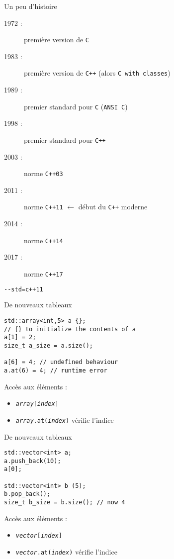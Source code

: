 
\begin{frame}[fragile]{Un peu d'histoire}
  \begin{description}
  \item[1972 :] première version de \texttt{C}
  \item[1983 :] première version de \texttt{C++} (alors \texttt{C with classes})
  \item[1989 :] premier standard pour \texttt{C} (\texttt{ANSI C})
  \item[1998 :] premier standard pour \texttt{C++}
  \item[2003 :] norme \texttt{C++03}
  \item[2011 :] norme \texttt{C++11} $\leftarrow$ début du \texttt{C++} moderne
  \item[2014 :] norme \texttt{C++14}
  \item[2017 :] norme \texttt{C++17}
  \end{description}
  \begin{lstlisting}[language=bash]
    --std=c++11
  \end{lstlisting}
\end{frame}

\begin{frame}[fragile]{De nouveaux tableaux}
  \begin{lstlisting}
std::array<int,5> a {};
// {} to initialize the contents of a    
a[1] = 2;
size_t a_size = a.size();

a[6] = 4; // undefined behaviour
a.at(6) = 4; // runtime error
  \end{lstlisting}

  Accès aux éléments :
  \begin{itemize}
  \item \texttt{\textit{array}[\textit{index}]}
  \item \texttt{\textit{array}.at(\textit{index})} vérifie l'indice
  \end{itemize}
\end{frame}

\begin{frame}[fragile]{De nouveaux tableaux}
  \begin{lstlisting}
std::vector<int> a;
a.push_back(10);
a[0];

std::vector<int> b (5);
b.pop_back();
size_t b_size = b.size(); // now 4
  \end{lstlisting}

  Accès aux éléments :
  \begin{itemize}
  \item \texttt{\textit{vector}[\textit{index}]}
  \item \texttt{\textit{vector}.at(\textit{index})} vérifie l'indice
  \end{itemize}
\end{frame}

